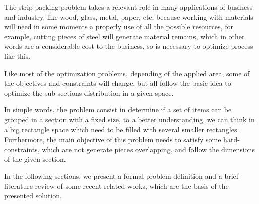 The strip-packing problem takes a relevant role
in many applications of business and industry,
like wood, glass, metal, paper, etc,
because working with materials will need in
some moments a properly use of all the possible resources,
for example, cutting pieces of steel will generate material remains,
which in other words are a considerable cost to the business,
so is necessary to optimize process like this.

Like most of the optimization problems,
depending of the applied area,
some of the objectives and constraints will change,
but all follow the basic idea to optimize the
sub-sections distribution  in a given space.

In simple words, the problem consist in determine if a
set of items can be grouped in a section with a fixed size,
to a better understanding, we can think in a big rectangle
space which need to be filled with several smaller rectangles.
Furthermore, the main objective of this problem needs to
satisfy some hard-constraints, which are not generate
pieces overlapping, and follow the dimensions
of the given section.

In the following sections,
we present a formal problem definition and a brief literature review of some recent related works,
which are the basis of the presented solution.
